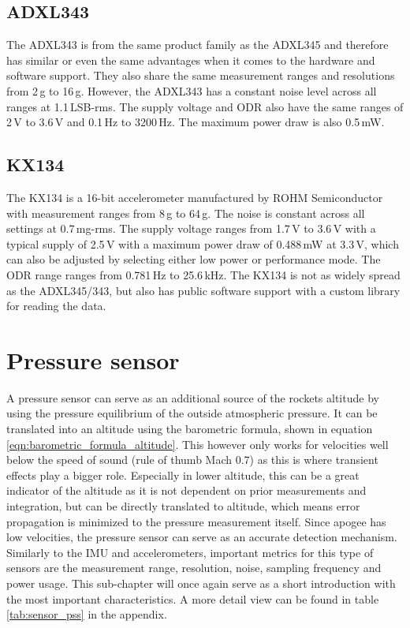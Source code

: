 \documentclass[fontsize=11pt,%
twoside,%
BCOR          = 8mm, %
DIV           = 11,  %
titlepage     = off,%
index=totoc,%
xcolor        = pdftex,%
dvipsnames,%
bibliography  = totoc,%
bibliography = numbered, %
listof        = notnumbered]{scrreprt}
\begin{document}
\subsection{ADXL343}
The ADXL343 is from the same product family as the ADXL345 and therefore has similar or even the same advantages when it comes to the hardware and software support. They also share the same measurement ranges and resolutions from 2\,g to 16\,g. However, the ADXL343 has a constant noise level across all ranges at 1.1\,LSB-rms. The supply voltage and ODR also have the same ranges of 2\,V to 3.6\,V and 0.1\,Hz to 3200\,Hz. The maximum power draw is also 0.5\,mW.

\subsection{KX134}
The KX134 is a 16-bit accelerometer manufactured by ROHM Semiconductor with measurement ranges from 8\,g to 64\,g. The noise is constant across all settings at 0.7\,mg-rms. The supply voltage ranges from 1.7\,V to 3.6\,V with a typical supply of 2.5\,V with a maximum power draw of 0.488\,mW at 3.3\,V, which can also be adjusted by selecting either low power or performance mode. The ODR range ranges from 0.781\,Hz to 25.6\,kHz. The KX134 is not as widely spread as the ADXL345/343, but also has public software support with a custom library for reading the data.

\section{Pressure sensor}
A pressure sensor can serve as an additional source of the rockets altitude by using the pressure equilibrium of the outside atmospheric pressure. It can be translated into an altitude using the barometric formula, shown in equation \ref{eqn:barometric_formula_altitude}. This however only works for velocities well below the speed of sound (rule of thumb Mach 0.7) as this is where transient effects play a bigger role. Especially in lower altitude, this can be a great indicator of the altitude as it is not dependent on prior measurements and integration, but can be directly translated to altitude, which means error propagation is minimized to the pressure measurement itself. Since apogee has low velocities, the pressure sensor can serve as an accurate detection mechanism.\\
Similarly to the IMU and accelerometers, important metrics for this type of sensors are the measurement range, resolution, noise, sampling frequency and power usage. This sub-chapter will once again serve as a short introduction with the most important characteristics. A more detail view can be found in table \ref{tab:sensor_pss} in the appendix.
\end{document}
